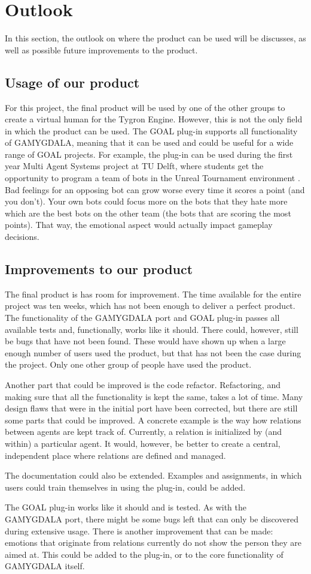\section{Outlook}
In this section, the outlook on where the product can be used will be discusses, as well as possible future improvements to the product.

\subsection{Usage of our product}
For this project, the final product will be used by one of the other groups to create a virtual human for the Tygron Engine. However, this is not the only field in which the product can be used. The GOAL plug-in supports all functionality of GAMYGDALA, meaning that it can be used and could be useful for a wide range of GOAL projects. For example, the plug-in can be used during the first year Multi Agent Systems project at TU Delft, where students get the opportunity to program a team of bots in the Unreal Tournament environment \citep{UT}. Bad feelings for an opposing bot can grow worse every time it scores a point (and you don't). Your own bots could focus more on the bots that they hate more which are the best bots on the other team (the bots that are scoring the most points). That way, the emotional aspect would actually impact gameplay decisions.

\subsection{Improvements to our product}
The final product is has room for improvement. The time available for the entire project was ten weeks, which has not been enough to deliver a perfect product. The functionality of the GAMYGDALA port and GOAL plug-in passes all available tests and, functionally, works like it should. There could, however, still be bugs that have not been found. These would have shown up when a large enough number of users used the product, but that has not been the case during the project. Only one other group of people have used the product. \par
Another part that could be improved is the code refactor. Refactoring, and making sure that all the functionality is kept the same, takes a lot of time. Many design flaws that were in the initial port have been corrected, but there are still some parts that could be improved. A concrete example is the way how relations between agents are kept track of. Currently, a relation is initialized by (and within) a particular agent. It would, however, be better to create a central, independent place where relations are defined and managed. \par
The documentation could also be extended. Examples and assignments, in which users could train themselves in using the plug-in, could be added. \par
The GOAL plug-in works like it should and is tested. As with the GAMYGDALA port, there might be some bugs left that can only be discovered during extensive usage. There is another improvement that can be made: emotions that originate from relations currently do not show the person they are aimed at. This could be added to the plug-in, or to the core functionality of GAMYGDALA itself.